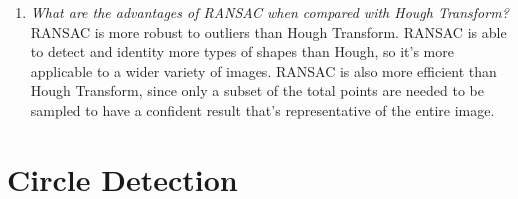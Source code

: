 \documentclass[11pt]{article}
\begin{document}
\begin{enumerate}
    \item \textit{What are the advantages of RANSAC when compared with Hough Transform?}\newline
    RANSAC is more robust to outliers than Hough Transform. RANSAC is able to detect and identity more types of
    shapes than Hough, so it's more applicable to a wider variety of images. RANSAC is also more efficient than Hough
    Transform, since only a subset of the total points are needed to be sampled to have a confident result that's
    representative of the entire image.\newline

    \end{enumerate}

    \section{Circle Detection}
\end{document}
